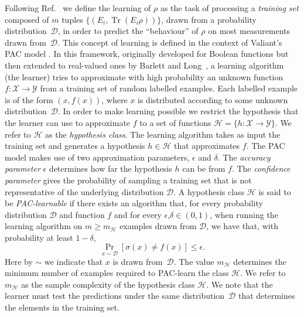 \documentclass[aps,superscriptaddress,nofootinbib,twocolumn]{revtex4-1}
\begin{document}
Following Ref.~\cite{aaronson2007learnability} we define the learning of $\rho$ as the task of processing a \textit{training set} composed of $m$ tuples $\{ (E_i, \operatorname*{Tr}(E_i \rho) ) \}$, drawn from a probability distribution~$\mathcal{D}$, in order to predict the ``behaviour'' of $\rho$ on most measurements drawn from~$\mathcal{D}$. This concept of learning is defined in the context of Valiant's PAC model \cite{valiant1984theory}. In this framework, originally developed for Boolean functions but then extended to real-valued ones by Barlett and Long~\cite{barlett1994fat}, a learning algorithm (the learner) tries to approximate with high probability an unknown function $f: \mathcal{X} \rightarrow \mathcal{Y} $ from a training set of random labelled examples. Each labelled example is of the form $(x,f(x))$, where $x$ is distributed according to some unknown distribution~$\mathcal{D}$. In order to make learning possible we restrict the hypothesis that the learner can use to approximate $f$ to a set of functions $\mathcal{H}= \{ h: \mathcal{X} \rightarrow \mathcal{Y} \}$. We refer to $\mathcal{H}$ as the \textit{hypothesis class}. The learning algorithm takes as input the training set and generates a hypothesis $h \in \mathcal{H} $ that approximates $f$. The PAC model makes use of two approximation parameters, $\epsilon$ and $\delta$. The \textit{accuracy parameter} $\epsilon$ determines how far the hypothesis $h$ can be from $f$. The \textit{confidence parameter} gives the probability of sampling a training set that is not representative of the underlying distribution $\mathcal{D}$.  A hypothesis class $\mathcal{H}$ is said to be \textit{PAC-learnable} if there exists an algorithm that, for every probability distribution $\mathcal{D}$ and function $f$ and for every $\epsilon$,$\delta\in (0,1)$, when running the learning algorithm on $m \geq m_{\mathcal{H}}$ examples drawn from $\mathcal{D}$, we have that, with probability at least $1-\delta$, 
$$\Pr_{x\sim \mathcal{D}}[\sigma(x)\neq f(x)]\leq\epsilon.$$
Here by $\sim$ we indicate that $x$ is drawn from~$\mathcal{D}$. The value $m_{\mathcal{H}}$ determines the minimum number of examples required to PAC-learn the class $\mathcal{H}$.  We refer to $m_{\mathcal{H}}$ as the sample complexity of the hypothesis class $\mathcal{H}$. We note that the learner must test the predictions under the same distribution~$\mathcal{D}$ that determines the elements in the training set.
\end{document}
